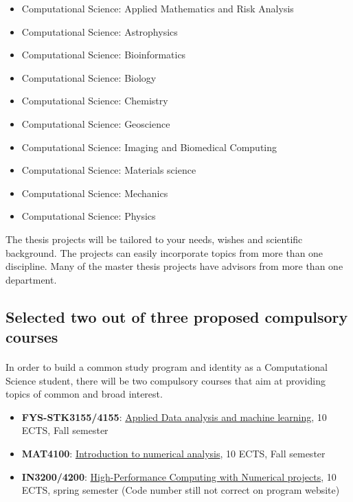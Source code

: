 \documentclass[%
oneside,                 %
final,                   %
10pt]{article}
\begin{document}
\begin{itemize}
\item Computational Science: Applied Mathematics and Risk Analysis

\item Computational Science: Astrophysics

\item Computational Science: Bioinformatics

\item Computational Science: Biology

\item Computational Science: Chemistry

\item Computational Science: Geoscience

\item Computational Science: Imaging and Biomedical Computing

\item Computational Science: Materials science

\item Computational Science: Mechanics

\item Computational Science: Physics
\end{itemize}

\noindent
The thesis projects will be tailored to your needs, wishes and scientific background. The projects can easily incorporate topics from more than one discipline. Many of the master thesis projects have advisors from more than one department.



\subsection{Selected two out of three proposed compulsory courses}

\paragraph{}
In order to build a common study program and identity as a Computational Science student, there will be two compulsory courses that aim at providing topics of common and broad interest.

\begin{itemize}
\item \textbf{FYS-STK3155/4155}: \href{{https://www.uio.no/studier/emner/matnat/fys/FYS-STK4155/index-eng.html}}{Applied Data analysis and machine learning}, 10 ECTS, Fall semester

\item \textbf{MAT4100}: \href{{https://www.uio.no/studier/emner/matnat/math/MAT4110/index-eng.html}}{Introduction to numerical analysis}, 10 ECTS, Fall semester

\item \textbf{IN3200/4200}: \href{{https://www.uio.no/studier/emner/matnat/ifi/IN3200/index-eng.html}}{High-Performance Computing with Numerical projects}, 10 ECTS, spring semester (Code number still not correct on program website)
\end{itemize}
\end{document}
